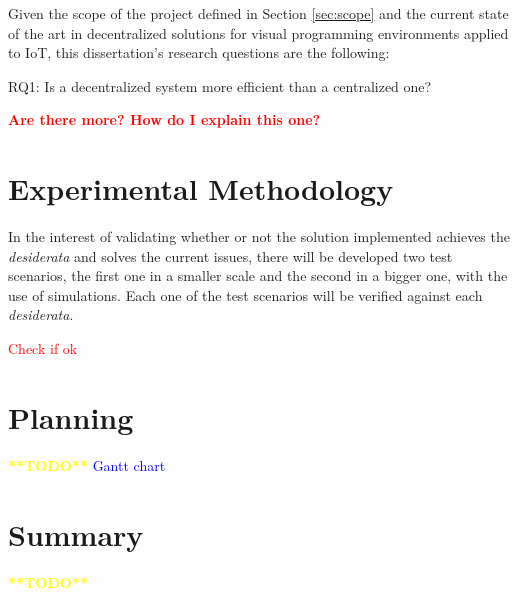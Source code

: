 Given the scope of the project defined in Section \ref{sec:scope} and the current state of the art in decentralized solutions for visual programming environments applied to IoT, this dissertation's  research questions are the following:

\begin{description}
    \item [RQ1: Is a decentralized system more efficient than a centralized one?]
\end{description}
\textcolor{red}{\textbf{Are there more? How do I explain this one?}}

\section{Experimental Methodology}\label{sec:exp_meth}

In the interest of validating whether or not the solution implemented achieves the \emph{desiderata} and solves the current issues, there will be developed two test scenarios, the first one in a smaller scale and the second in a bigger one, with the use of simulations. Each one of the test scenarios will be verified against each \emph{desiderata}. 

\textcolor{red}{Check if ok}

\section{Planning}\label{sec:planning}

\textcolor{yellow}{\textbf{**TODO**}}
\textcolor{blue}{Gantt chart}

\section{Summary}\label{sec:stat_summary}

\textcolor{yellow}{\textbf{**TODO**}}
